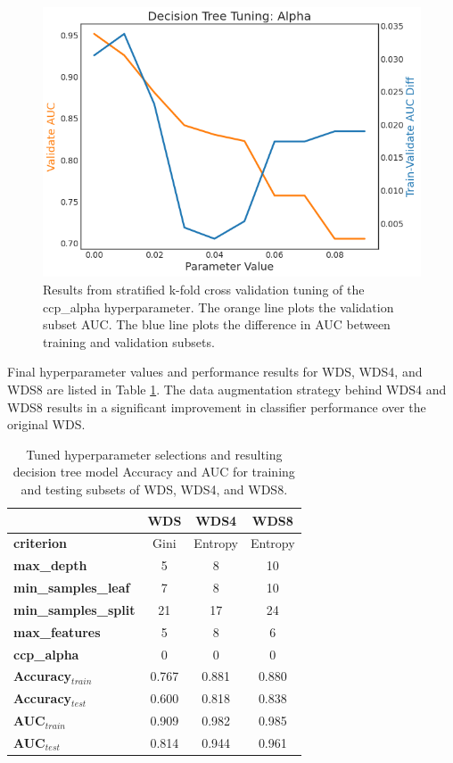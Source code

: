 \begin{figure}[!htp]
\centering
\includegraphics[width=.6\textwidth]{templates/images/Figure-DT_tuning_alpha.png}
\caption[Decision tree alpha tuning]{Results from stratified k-fold cross validation tuning of the ccp\_alpha hyperparameter. The orange line plots the validation subset AUC. The blue line plots the difference in AUC between training and validation subsets.}
\label{fig:dtree_alpha}
\end{figure}

Final hyperparameter values and performance results for WDS, WDS4, and WDS8 are listed in Table \ref{tab:dtree_tuning}. The data augmentation strategy behind WDS4 and WDS8 results in a significant improvement in classifier performance over the original WDS.

\begin{table}[!htp]
\centering
\begin{tabular}{l|c|c|c|}
\cline{2-4}
                                          & \textbf{WDS} & \textbf{WDS4} & \textbf{WDS8} \\ \hline
\multicolumn{1}{|l|}{\textbf{criterion}}           & Gini & Entropy & Entropy \\ \hline
\multicolumn{1}{|l|}{\textbf{max\_depth}}          & 5    & 8    & 10   \\ \hline
\multicolumn{1}{|l|}{\textbf{min\_samples\_leaf}}  & 7    & 8    & 10   \\ \hline
\multicolumn{1}{|l|}{\textbf{min\_samples\_split}} & 21   & 17   & 24   \\ \hline
\multicolumn{1}{|l|}{\textbf{max\_features}}       & 5    & 8    & 6    \\ \hline
\multicolumn{1}{|l|}{\textbf{ccp\_alpha}}          & 0    & 0    & 0    \\ \hline
\multicolumn{1}{|l|}{\textbf{Accuracy$_{train}$}}  & 0.767 & 0.881 & 0.880 \\ \hline
\multicolumn{1}{|l|}{\textbf{Accuracy$_{test}$}}   & 0.600 & 0.818 & 0.838 \\ \hline
\multicolumn{1}{|l|}{\textbf{AUC$_{train}$}}       & 0.909 & 0.982 & 0.985 \\ \hline
\multicolumn{1}{|l|}{\textbf{AUC$_{test}$}}        & 0.814 & 0.944 & 0.961 \\ \hline
\end{tabular}
\caption[Decision tree hyperparameter values]{Tuned hyperparameter selections and resulting decision tree model Accuracy and AUC for training and testing subsets of WDS, WDS4, and WDS8.}
\label{tab:dtree_tuning}
\end{table}


